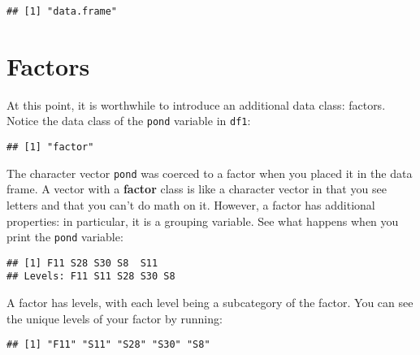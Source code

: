 \documentclass[]{book}
\newenvironment{Shaded}{\begin{snugshade}}{\end{snugshade}}
\newcommand{\KeywordTok}[1]{\textcolor[rgb]{0.13,0.29,0.53}{\textbf{#1}}}
\newcommand{\OperatorTok}[1]{\textcolor[rgb]{0.81,0.36,0.00}{\textbf{#1}}}
\newcommand{\NormalTok}[1]{#1}
\theoremstyle{definition}
\theoremstyle{definition}
\theoremstyle{definition}
\theoremstyle{remark}
\begin{document}
\begin{verbatim}
## [1] "data.frame"
\end{verbatim}

\section{Factors}\label{factors}

At this point, it is worthwhile to introduce an additional data class:
factors. Notice the data class of the \texttt{pond} variable in
\texttt{df1}:

\begin{Shaded}
\end{Shaded}

\begin{verbatim}
## [1] "factor"
\end{verbatim}

The character vector \texttt{pond} was coerced to a factor when you
placed it in the data frame. A vector with a \textbf{factor} class is
like a character vector in that you see letters and that you can't do
math on it. However, a factor has additional properties: in particular,
it is a grouping variable. See what happens when you print the
\texttt{pond} variable:

\begin{Shaded}
\end{Shaded}

\begin{verbatim}
## [1] F11 S28 S30 S8  S11
## Levels: F11 S11 S28 S30 S8
\end{verbatim}

A factor has levels, with each level being a subcategory of the factor.
You can see the unique levels of your factor by running:

\begin{Shaded}
\end{Shaded}

\begin{verbatim}
## [1] "F11" "S11" "S28" "S30" "S8"
\end{verbatim}
\end{document}
